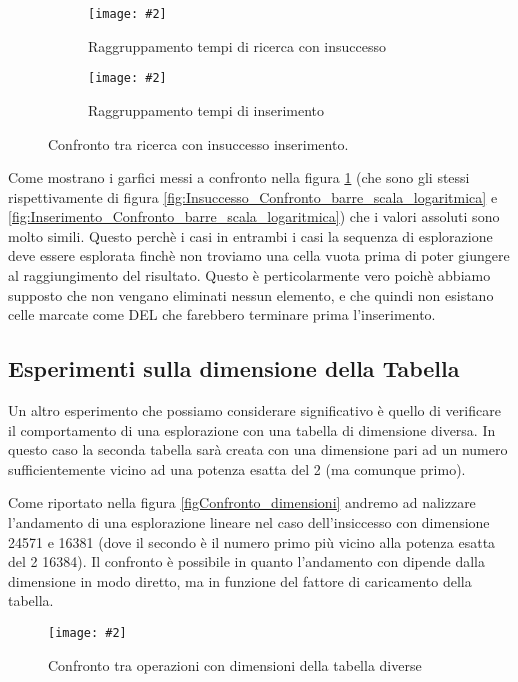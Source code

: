 \documentclass{article}
\newcommand{\image}[3][1]{
	\centering
	\texttt{[image: \#2]}
	\caption{#3}
}
\begin{document}
\begin{figure}[H]
\begin{subfigure}[b]{0.5\textwidth}
\image{Insuccesso_Confronto_barre_scala_logaritmica}{Raggruppamento tempi di ricerca con insuccesso}
\end{subfigure}
\begin{subfigure}[b]{0.5\textwidth}
\image{Inserimento_Confronto_barre_scala_logaritmica}{Raggruppamento tempi di inserimento}
\end{subfigure}
\caption{Confronto tra ricerca con insuccesso inserimento.}
\label{fig:Confronto_ricerca_insuccesso}
\end{figure}

Come mostrano i garfici messi a confronto nella figura \ref{fig:Confronto_ricerca_insuccesso} (che sono gli stessi rispettivamente di figura \ref{fig:Insuccesso_Confronto_barre_scala_logaritmica} e \ref{fig:Inserimento_Confronto_barre_scala_logaritmica}) che i valori assoluti sono molto simili. Questo perchè i casi in entrambi i casi la sequenza di esplorazione deve essere esplorata finchè non troviamo una cella vuota prima di poter giungere al raggiungimento del risultato. Questo è perticolarmente vero poichè abbiamo supposto che non vengano eliminati nessun elemento, e che quindi non esistano celle marcate come DEL che farebbero terminare prima l'inserimento.

\subsection{Esperimenti sulla dimensione della Tabella}
Un altro esperimento che possiamo considerare significativo è quello di verificare il comportamento di una esplorazione con una tabella di dimensione diversa. In questo caso la seconda tabella sarà creata con una dimensione pari ad un numero sufficientemente vicino ad una potenza esatta del 2 (ma comunque primo).

Come riportato nella figura \ref{figConfronto_dimensioni} andremo ad nalizzare l'andamento di una esplorazione lineare nel caso dell'insiccesso con dimensione 24571 e 16381 (dove il secondo è il numero primo più vicino alla potenza esatta del 2 16384). Il confronto è possibile in quanto l'andamento con dipende dalla dimensione in modo diretto, ma in funzione del fattore di caricamento della tabella.

\begin{figure}[H]
\image[0.75]{Insuccesso_Confronto_Lineare_d24571_d16381_scala_logaritmica_suffisso}{Confronto tra operazioni con dimensioni della tabella diverse}
\label{fig:Confronto_dimensioni}
\end{figure}
\end{document}
